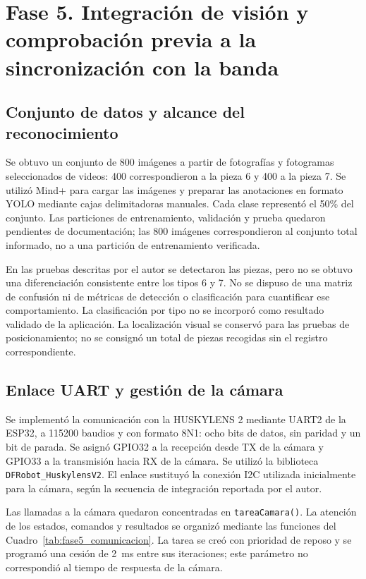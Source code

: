 \section{Fase 5. Integración de visión y comprobación previa a la sincronización con la banda}
\label{sec:resultados_fase5}

\subsection{Conjunto de datos y alcance del reconocimiento}

Se obtuvo un conjunto de 800 imágenes a partir de fotografías y fotogramas seleccionados de videos: 400 correspondieron a la pieza 6 y 400 a la pieza 7. Se utilizó Mind+ para cargar las imágenes y preparar las anotaciones en formato YOLO mediante cajas delimitadoras manuales. Cada clase representó el 50\% del conjunto. Las particiones de entrenamiento, validación y prueba quedaron pendientes de documentación; las 800 imágenes correspondieron al conjunto total informado, no a una partición de entrenamiento verificada.

En las pruebas descritas por el autor se detectaron las piezas, pero no se obtuvo una diferenciación consistente entre los tipos 6 y 7. No se dispuso de una matriz de confusión ni de métricas de detección o clasificación para cuantificar ese comportamiento. La clasificación por tipo no se incorporó como resultado validado de la aplicación. La localización visual se conservó para las pruebas de posicionamiento; no se consignó un total de piezas recogidas sin el registro correspondiente.

\subsection{Enlace UART y gestión de la cámara}

Se implementó la comunicación con la HUSKYLENS 2 mediante UART2 de la ESP32, a 115200 baudios y con formato 8N1: ocho bits de datos, sin paridad y un bit de parada. Se asignó GPIO32 a la recepción desde TX de la cámara y GPIO33 a la transmisión hacia RX de la cámara. Se utilizó la biblioteca \texttt{DFRobot\_HuskylensV2}. El enlace sustituyó la conexión I2C utilizada inicialmente para la cámara, según la secuencia de integración reportada por el autor.

Las llamadas a la cámara quedaron concentradas en \texttt{tareaCamara()}. La atención de los estados, comandos y resultados se organizó mediante las funciones del Cuadro~\ref{tab:fase5_comunicacion}. La tarea se creó con prioridad de reposo y se programó una cesión de 2~ms entre sus iteraciones; este parámetro no correspondió al tiempo de respuesta de la cámara.

